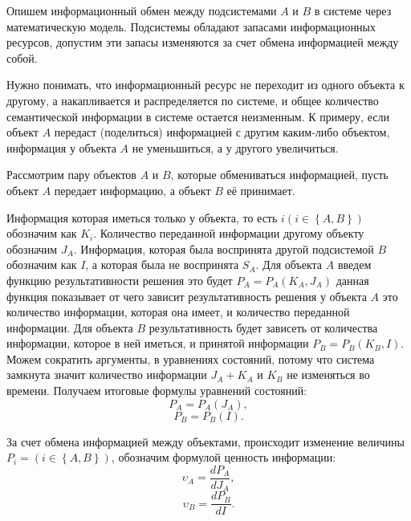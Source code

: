 
  
Опишем информационный обмен между подсистемами $A$ и $B$ в системе через математическую модель.
Подсистемы обладают запасами информационных ресурсов, допустим эти запасы изменяются за счет обмена информацией между собой. 


Нужно понимать, что информационный ресурс не переходит из одного объекта к другому, а накапливается и распределяется по системе, и общее количество семантической информации в системе остается неизменным. К примеру, если объект $A$ передаст (поделиться) информацией с другим каким-либо объектом, информация у объекта $A$ не уменьшиться, а у другого увеличиться.

Рассмотрим пару объектов $A$ и $B$, которые обмениваться информацией, пусть объект $A$ передает информацию, а объект $B$ её принимает.

Информация которая иметься только у объекта, то есть  $i \left( i \in \left\{A,B \right\} \right)$ обозначим как $K_i$. Количество переданной информации другому объекту обозначим $J_A$. Информация, которая была воспринята другой подсистемой $B$ обозначим как $I$, а которая была не воспринята $S_A$. Для объекта $A$ введем функцию результативности решения это будет $P_A=P_A(K_A,J_A)$ данная функция показывает от чего зависит результативность решения у объекта $A$ 	это количество информации, которая она имеет, и количество переданной информации. Для объекта $B$ результативность будет зависеть от количества информации, которое в ней иметься, и принятой информации $P_B=P_B(K_B,I)$. 
Можем сократить аргументы, в уравнениях состояний, потому что система замкнута значит количество информации $J_A+K_A$ и $K_B$ не изменяться во времени. Получаем итоговые формулы уравнений состояний:
\begin{equation}\label{eq:sost1}
P_A=P_A(J_A),
\end{equation}
\begin{equation}\label{eq:sost2}
P_B=P_B(I). 
\end{equation}

За счет обмена информацией между объектами, происходит изменение величины $P_i = \left( i \in \left\{A,B \right\} \right)$, обозначим формулой ценность информации:
\begin{equation}\label{eq:cenoostinfo1}
\upsilon_A = \frac{dP_A}{dJ_A},
\end{equation}
\begin{equation}\label{eq:cenoostinfo2}
\upsilon_B = \frac{dP_B	}{dI}.
\end{equation}

